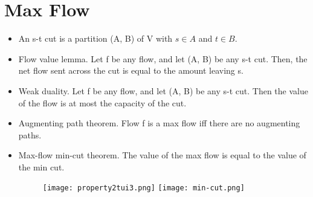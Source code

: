\documentclass[10pt,a4paper,twocolumn]{article}
\begin{document}
\section{Max Flow}
\begin{itemize}
  \item An s-t cut is a partition (A, B) of V with \(s \in A\) and \(t \in B\).
  \item Flow value lemma. Let f be any flow, and let (A, B) be any s-t cut. Then, the net flow sent across the cut is equal to the amount leaving s.
  \item Weak duality. Let f be any flow, and let (A, B) be any s-t cut. Then the value of the flow is at most the capacity of the cut.
  \item Augmenting path theorem. Flow f is a max flow iff there are no augmenting paths.
  \item Max-flow min-cut theorem. The value of the max flow is equal to the value of the min cut.
  \begin{figure}[h]
    \centering
    \texttt{[image: property2tui3.png]}
    \texttt{[image: min-cut.png]}
  \end{figure}
\end{itemize}
\end{document}
